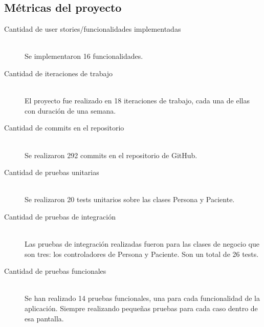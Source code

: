 \subsection{Métricas del proyecto}

\begin{description}
\item[Cantidad de user stories/funcionalidades implementadas] \mbox{} \\
Se implementaron 16 funcionalidades.

\item[Cantidad de iteraciones de trabajo] \mbox{} \\
El proyecto fue realizado en 18 iteraciones de trabajo, cada una de ellas con duración de una semana.

\item[Cantidad de commits en el repositorio] \mbox{} \\
Se realizaron 292 commits en el repositorio de GitHub.

\item[Cantidad de pruebas unitarias] \mbox{} \\
Se realizaron 20 tests unitarios sobre las clases Persona y Paciente.

\item[Cantidad de pruebas de integración] \mbox{} \\
Las pruebas de integración realizadas fueron para las clases de negocio que son tres: los controladores de Persona y Paciente. Son un total de 26 tests.

\item[Cantidad de pruebas funcionales] \mbox{} \\
Se han realizado 14 pruebas funcionales, una para cada funcionalidad de la aplicación. Siempre realizando pequeñas pruebas para cada caso dentro de esa pantalla.


\end{description}